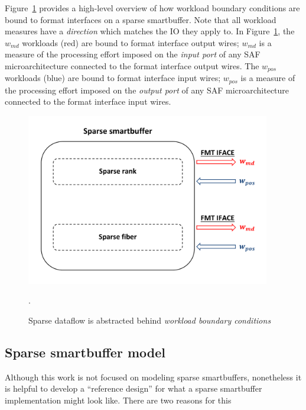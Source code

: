 Figure~\ref{fig:sparse_sbuff_wkld_overview} provides a high-level overview of how workload boundary conditions are bound to format interfaces on a sparse smartbuffer. Note that all workload measures have a \textit{direction} which matches the IO they apply to. In Figure~\ref{fig:sparse_sbuff_wkld_overview}, the $w_{md}$ workloads (red) are bound to format interface output wires; $w_{md}$ is a measure of the processing effort imposed on the \textit{input port} of any SAF microarchitecture connected to the format interface output wires. The $w_{pos}$ workloads (blue) are bound to format interface input wires; $w_{pos}$ is a measure of the processing effort imposed on the \textit{output port} of any SAF microarchitecture connected to the format interface input wires.

\begin{figure}[ht]
    \centering
    \includegraphics[width=0.95\textwidth]{figures/sparse_sbuf_wkld_overview.pdf}
    \caption{Sparse dataflow is abstracted behind \textit{workload boundary conditions}}.
    \label{fig:sparse_sbuff_wkld_overview}
\end{figure}




\subsection{Sparse smartbuffer model}

Although this work is not focused on modeling sparse smartbuffers, nonetheless it is helpful to develop a ``reference design'' for what a sparse smartbuffer implementation might look like. There are two reasons for this

